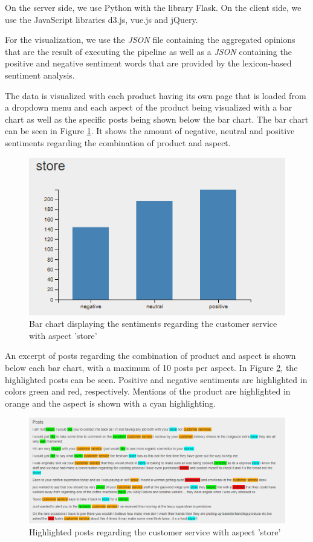 \documentclass[10pt,a4paper]{article}
\begin{document}
		On the server side, we use Python with the library Flask. On the client side, we use the JavaScript libraries d3.js, vue.js and jQuery.
	
		For the visualization, we use the \textit{JSON} file containing the aggregated opinions that are the result of executing the pipeline as well as a \textit{JSON} containing the positive and negative sentiment words that are provided by the lexicon-based sentiment analysis.
	
		The data is visualized with each product having its own page that is loaded from a dropdown menu and each aspect of the product being visualized with a bar chart as well as the specific posts being shown below the bar chart. The bar chart can be seen in Figure \ref{fig:barchart}. It shows the amount of negative, neutral and positive sentiments regarding the combination of product and aspect.
	
		\begin{figure}[h]
			\centering
			\includegraphics[width=0.7\linewidth]{data/barchart}
			\caption{Bar chart displaying the sentiments regarding the customer service with aspect 'store'}
			\label{fig:barchart}
		\end{figure}
			
	An excerpt of posts regarding the combination of product and aspect is shown below each bar chart, with a maximum of 10 posts per aspect. In Figure \ref{fig:posts}, the highlighted posts can be seen. Positive and negative sentiments are highlighted in colors green and red, respectively. Mentions of the product are highlighted in orange and the aspect is shown with a cyan highlighting.	
			
		\begin{figure}[h]
			\centering
			\includegraphics[width=0.9\linewidth]{data/posts}
			\caption{Highlighted posts regarding the customer service with aspect 'store'}
			\label{fig:posts}
		\end{figure}
		
\end{document}
